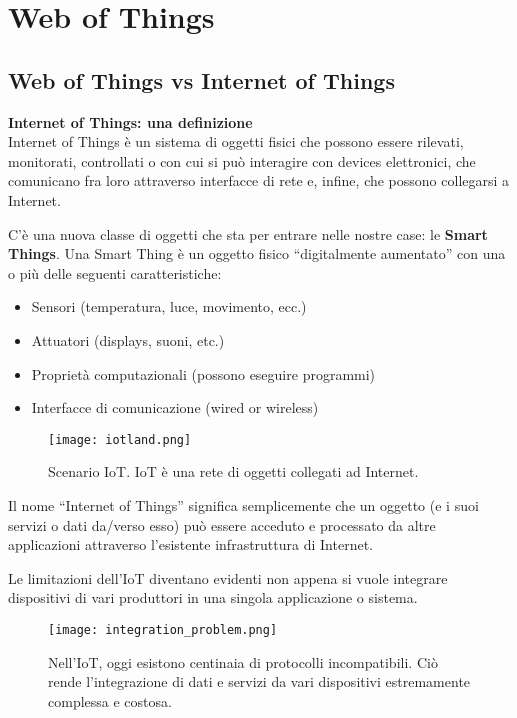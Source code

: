 \chapter{Web of Things}
\label{web-of-things}

\section{Web of Things vs Internet of Things}

\textbf{Internet of Things: una definizione} \\

Internet of Things è un sistema di oggetti fisici che possono essere
rilevati, monitorati, controllati o con cui si può interagire con
devices elettronici, che comunicano fra loro attraverso interfacce di rete
e, infine, che possono collegarsi a Internet.

C'è una nuova classe di oggetti che sta per entrare nelle nostre case:
le \textbf{Smart Things}. Una Smart Thing è un oggetto fisico ``digitalmente
aumentato'' con una o più delle seguenti caratteristiche:

\begin{itemize}
  \item Sensori (temperatura, luce, movimento, ecc.)
  \item Attuatori (displays, suoni, etc.)
  \item Proprietà computazionali (possono eseguire programmi)
  \item Interfacce di comunicazione (wired or wireless)
\end{itemize}

\begin{figure}[H]
  \centering
  \texttt{[image: iotland.png]}
  \caption{Scenario IoT. IoT è una rete di oggetti collegati ad Internet.}
  \label{fig:iotland}
\end{figure}

Il nome ``Internet of Things'' significa semplicemente che un oggetto (e i
suoi servizi o dati da/verso esso) può essere acceduto e processato da altre
applicazioni attraverso l'esistente infrastruttura di Internet.

Le limitazioni dell'IoT diventano evidenti non appena si vuole integrare
dispositivi di vari produttori in una singola applicazione o sistema.

\begin{figure}[H]
  \centering
  \texttt{[image: integration\_problem.png]}
  \caption{Nell'IoT, oggi esistono centinaia di protocolli incompatibili.
Ciò rende l'integrazione di dati e servizi da vari dispositivi estremamente
complessa e costosa.}
  \label{fig:integration_problem}
\end{figure}


